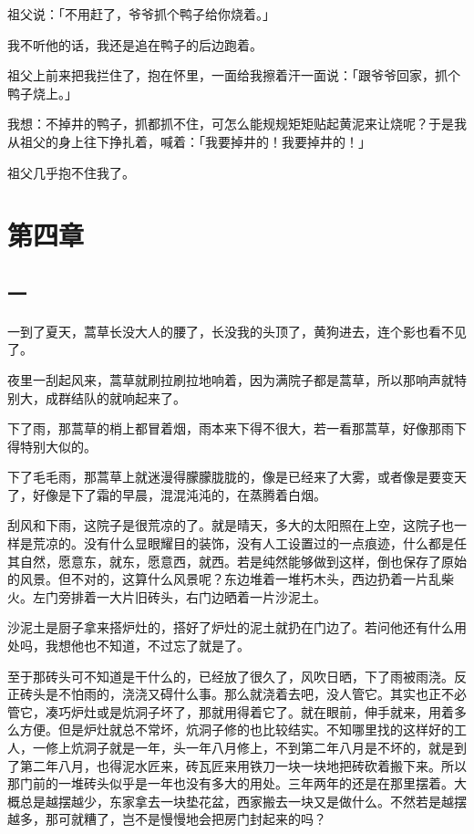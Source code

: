 \documentclass[UTF8]{ctexart}
\begin{document}
祖父说：「不用赶了，爷爷抓个鸭子给你烧着。」

我不听他的话，我还是追在鸭子的后边跑着。

祖父上前来把我拦住了，抱在怀里，一面给我擦着汗一面说：「跟爷爷回家，抓个鸭子烧上。」

我想：不掉井的鸭子，抓都抓不住，可怎么能规规矩矩贴起黄泥来让烧呢？于是我从祖父的身上往下挣扎着，喊着：「我要掉井的！我要掉井的！」

祖父几乎抱不住我了。

\section{第四章}

\subsection{一}

一到了夏天，蒿草长没大人的腰了，长没我的头顶了，黄狗进去，连个影也看不见了。

夜里一刮起风来，蒿草就刷拉刷拉地响着，因为满院子都是蒿草，所以那响声就特别大，成群结队的就响起来了。

下了雨，那蒿草的梢上都冒着烟，雨本来下得不很大，若一看那蒿草，好像那雨下得特别大似的。

下了毛毛雨，那蒿草上就迷漫得朦朦胧胧的，像是已经来了大雾，或者像是要变天了，好像是下了霜的早晨，混混沌沌的，在蒸腾着白烟。

刮风和下雨，这院子是很荒凉的了。就是晴天，多大的太阳照在上空，这院子也一样是荒凉的。没有什么显眼耀目的装饰，没有人工设置过的一点痕迹，什么都是任其自然，愿意东，就东，愿意西，就西。若是纯然能够做到这样，倒也保存了原始的风景。但不对的，这算什么风景呢？东边堆着一堆朽木头，西边扔着一片乱柴火。左门旁排着一大片旧砖头，右门边晒着一片沙泥土。

沙泥土是厨子拿来搭炉灶的，搭好了炉灶的泥土就扔在门边了。若问他还有什么用处吗，我想他也不知道，不过忘了就是了。

至于那砖头可不知道是干什么的，已经放了很久了，风吹日晒，下了雨被雨浇。反正砖头是不怕雨的，浇浇又碍什么事。那么就浇着去吧，没人管它。其实也正不必管它，凑巧炉灶或是炕洞子坏了，那就用得着它了。就在眼前，伸手就来，用着多么方便。但是炉灶就总不常坏，炕洞子修的也比较结实。不知哪里找的这样好的工人，一修上炕洞子就是一年，头一年八月修上，不到第二年八月是不坏的，就是到了第二年八月，也得泥水匠来，砖瓦匠来用铁刀一块一块地把砖砍着搬下来。所以那门前的一堆砖头似乎是一年也没有多大的用处。三年两年的还是在那里摆着。大概总是越摆越少，东家拿去一块垫花盆，西家搬去一块又是做什么。不然若是越摆越多，那可就糟了，岂不是慢慢地会把房门封起来的吗？
\end{document}
